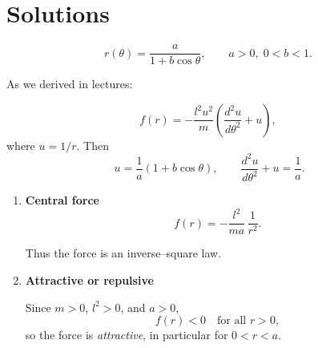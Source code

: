 \documentclass[../main.tex]{subfiles}
\begin{document}
\maketitle

\section*{Solutions}

\[
r(\theta)=\frac{a}{1+b\cos\theta}, \qquad a>0,\;0<b<1.
\]

As we derived in lectures:

\[
f(r)=-\frac{l^2u^2}{m} \!\left(\frac{d^2u}{d\theta^2}+u\right),
\]
where \(u=1/r\). Then
\[\
u=\frac{1}{a}(1+b\cos\theta),\qquad
\frac{d^2u}{d\theta^2}+u=\frac{1}{a}.
\]


\begin{enumerate}
\item \textbf{Central force}
\[
f(r)=-\frac{l^2}{ma}\,\frac{1}{r^2}.
\]

Thus the force is an inverse--square law.

\item \textbf{Attractive or repulsive}

Since \(m>0\), \(l^2>0\), and \(a>0\),
\[
f(r)<0 \quad \text{for all } r>0,
\]
so the force is \emph{attractive}, in particular for \(0<r<a\).
\end{enumerate}
\end{document}
